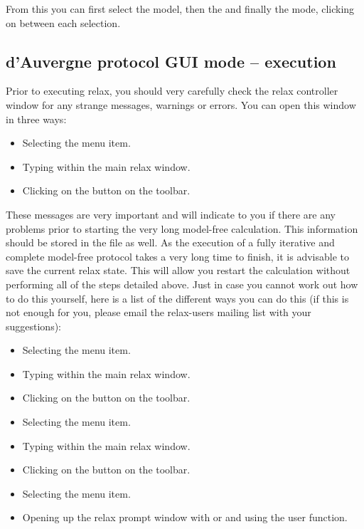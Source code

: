 \begin{htmlonly}
\begin{htmlonly}
From this you can first select the  model, then the  and finally the  mode, clicking on  between each selection.


\subsection{d'Auvergne protocol GUI mode -- execution}

Prior to executing relax, you should very carefully check the relax controller window for any strange messages, warnings or errors.  You can open this window in three ways:

\begin{itemize}
\item Selecting the  menu item.
\item Typing  within the main relax window.
\item Clicking on the  button on the toolbar.
\end{itemize}

These messages are very important and will indicate to you if there are any problems prior to starting the very long model-free calculation.  This information should be stored in the  file as well.  As the execution of a fully iterative and complete model-free protocol takes a very long time to finish, it is advisable to save the current relax state.  This will allow you restart the calculation without performing all of the steps detailed above.  Just in case you cannot work out how to do this yourself, here is a list of the different ways you can do this (if this is not enough for you, please email the relax-users mailing list with your suggestions):

\begin{itemize}
\item Selecting the  menu item.
\item Typing  within the main relax window.
\item Clicking on the  button on the toolbar.
\item Selecting the  menu item.
\item Typing  within the main relax window.
\item Clicking on the  button on the toolbar.
\item Selecting the  menu item.
\item Opening up the relax prompt window with  or  and using the  user function.
\end{itemize}


\end{htmlonly}
\end{htmlonly}
